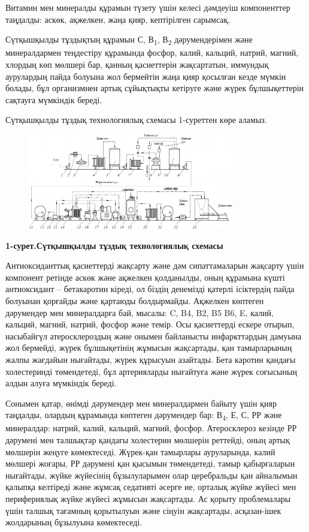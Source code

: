 {Витамин мен минералды құрамын түзету үшін келесі дәмдеуіш компоненттер
таңдалды: аскөк, ақжелкен, жаңа қияр, кептірілген сарымсақ.

Сүтқышқылды тұздықтың құрамын С, В\textsubscript{1}, В\textsubscript{2}
дәрумендерімен және минералдармен теңдестіру құрамында фосфор, калий,
кальций, натрий, магний, хлордың көп мөлшері бар, қанның қасиеттерін
жақсартатын, иммундық аурулардың пайда болуына жол бермейтін жаңа қияр
қосылған кезде мүмкін болады, бұл организмнен артық сұйықтықты кетіруге
және жүрек бұлшықеттерін сақтауға мүмкіндік береді.

Сүтқышқылды тұздық технологиялық схемасы 1-суреттен көре аламыз.

\begin{figure}[H]
	\centering
	\includegraphics[width=0.8\textwidth]{media/pish2/image24}
	\caption*{}
\end{figure}


{\bfseries 1-сурет.Сүтқышқылды тұздық технологиялық схемасы}

Антиоксиданттық қасиеттерді жақсарту және дәм сипаттамаларын жақсарту
үшін компонент ретінде аскөк және ақжелкен қолданылды, оның құрамына
күшті антиоксидант -- бетакаротин кіреді, ол біздің денемізді қатерлі
ісіктердің пайда болуынан қорғайды және қартаюды болдырмайды. Ақжелкен
көптеген дәрумендер мен минералдарға бай, мысалы: C, B4, B2, B5 B6, E,
калий, кальций, магний, натрий, фосфор және темір. Осы қасиеттерді
ескере отырып, насыбайгүл атеросклероздың және онымен байланысты
инфаркттардың дамуына жол бермейді, жүрек бұлшықетінің жұмысын
жақсартады, қан тамырларының жалпы жағдайын нығайтады, жүрек құрысуын
азайтады. Бета каротин қандағы холестеринді төмендетеді, бұл
артерияларды нығайтуға және жүрек соғысының алдын алуға мүмкіндік
береді.

Сонымен қатар, өнімді дәрумендер мен минералдармен байыту үшін қияр
таңдалды, олардың құрамында көптеген дәрумендер бар: В\textsubscript{4},
Е, С, РР және минералдар: натрий, калий, кальций, магний, фосфор.
Атеросклероз кезінде РР дәрумені мен талшықтар қандағы холестерин
мөлшерін реттейді, оның артық мөлшерін жеңуге көмектеседі. Жүрек-қан
тамырлары ауруларында, калий мөлшері жоғары, РР дәрумені қан қысымын
төмендетеді, тамыр қабырғаларын нығайтады, жүйке жүйесінің бұзылуларымен
олар церебральды қан айналымын қалыпқа келтіреді және жұмсақ седативті
әсерге ие, орталық жүйке жүйесі мен перифериялық жүйке жүйесі жұмысын
жақсартады. Ас қорыту проблемалары үшін талшық тағамның қорытылуын және
сіңуін жақсартады, асқазан-ішек жолдарының бұзылуына көмектеседі.

}
